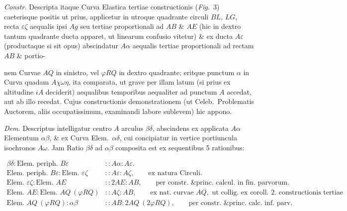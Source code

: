 \documentclass{article}
\begin{document}
\emph{Constr.} Descripta itaque Curva Elastica tertiae constructionis (\emph{Fig.}~3) caeterisque
positis ut prius, applicetur in utroque quadrante circuli $BL$, $LG$, recta $\varepsilon\zeta$
aequalis ipsi $Ag$ seu tertiae proportionali ad $AB$ \& $AE$ (hic in dextro tantum quadrante ducta
apparet, ut linearum confusio vitetur) \& ex ducta $A\varepsilon$ (productaque si sit opus)
abscindatur $A\alpha$ aequalis tertiae proportionali ad rectam $AB$ \& portio-

nem Curvae $AQ$ in sinistro, vel $\varphi RQ$ in dextro quadrante; eritque punctum $\alpha$ in Curva
quadam $A\chi\omega\eta$, ita comparata, ut grave per illam latum (si prius ex altitudine $iA$
deciderit) aequalibus temporibus aequaliter ad punctum $A$ accedat, aut ab illo recedat. Cujus
constructionis demonstrationem (ut Celeb.\ Problematis Auctorem, aliis occupatissimum, examinandi
labore sublevem) hic appono.


\emph{Dem.} Descriptus intelligatur centro $A$ arculus $\beta\delta$, abscindens ex applicata
$A\alpha$ Elementum $\alpha\beta$, \& ex Curva Elem.\ $\alpha\delta$, cui concipiatur in vertice
portiuncula isochronos $A\omega$. Jam Ratio $\beta\delta$ ad $\alpha\beta$ composita est ex
sequentibus 5 rationibus:

\[
\begin{aligned}
\beta\delta : \text{Elem. periph. } B\varepsilon &:: A\alpha : A\varepsilon. \\
\text{Elem. periph. } B\varepsilon : \text{Elem. } \varepsilon\zeta &:: A\varepsilon : A\zeta, \qquad \text{ex natura Circuli.} \\
\text{Elem. } \varepsilon\zeta : \text{Elem. } AE &:: 2AE : AB, \qquad \text{per constr. \& princ. calcul. in fin. parvorum.} \\
\text{Elem. } AE : \text{Elem. } AQ\ (\varphi RQ) &:: A\zeta : AB, \qquad \text{ex nat. curvae } AQ, \text{ ut collig. ex coroll. 2. constructionis tertiae praeced.} \\
\text{Elem. } AQ\ (\varphi RQ) : \alpha\beta &:: AB : 2AQ\ (2\varphi RQ), \qquad \text{per constr. \& princ. calc. inf. parv.}
\end{aligned}
\]
\end{document}
